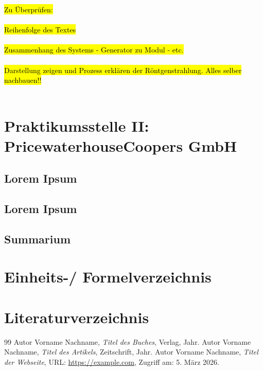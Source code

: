 \documentclass[12pt]{article} %
\begin{document}
\hl{Zu Überprüfen:
\\
\\
Reihenfolge des Textes
\\
\\
Zusammenhang des Systems - Generator zu Modul - etc.
\\
\\
Darstellung zeigen und Prozess erklären der Röntgenstrahlung. Alles selber nachbauen!!
\\
\\
}
\newpage

\section{Praktikumsstelle II: PricewaterhouseCoopers GmbH}
\subsection{Lorem Ipsum}
\subsection{Lorem Ipsum}
\subsection{Summarium}

\newpage

\newpage

\section{Einheits-/ Formelverzeichnis}

\section{Literaturverzeichnis}
\begin{thebibliography}{99}
     Autor Vorname Nachname, \textit{Titel des Buches}, Verlag, Jahr.
     Autor Vorname Nachname, \textit{Titel des Artikels}, Zeitschrift, Jahr.
     Autor Vorname Nachname, \textit{Titel der Webseite}, URL: \url{https://example.com}, Zugriff am: 5. März 2026.
\end{thebibliography}
\end{document}

